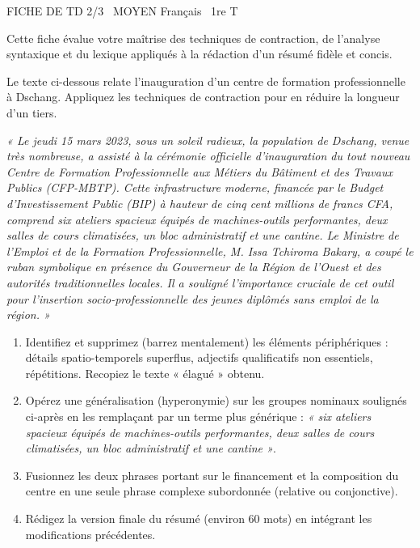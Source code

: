 \documentclass[11pt]{article}
\begin{document}
\begin{tcolorbox}[enhanced,colback=popink,colframe=popink,arc=10pt,boxrule=0pt,left=12pt,right=12pt,top=9pt,bottom=9pt]
{\color{white}\popxbold\small FICHE DE TD 2/3 \textbullet\ MOYEN \hfill Français \textbullet\ 1re T\par}
\end{tcolorbox}
\vspace{4pt}
Cette fiche évalue votre maîtrise des techniques de contraction, de l'analyse syntaxique et du lexique appliqués à la rédaction d'un résumé fidèle et concis.

\begin{exercice}
Le texte ci-dessous relate l'inauguration d'un centre de formation professionnelle à Dschang. Appliquez les techniques de contraction pour en réduire la longueur d'un tiers.

\textit{« Le jeudi 15 mars 2023, sous un soleil radieux, la population de Dschang, venue très nombreuse, a assisté à la cérémonie officielle d'inauguration du tout nouveau Centre de Formation Professionnelle aux Métiers du Bâtiment et des Travaux Publics (CFP-MBTP). Cette infrastructure moderne, financée par le Budget d'Investissement Public (BIP) à hauteur de cinq cent millions de francs CFA, comprend six ateliers spacieux équipés de machines-outils performantes, deux salles de cours climatisées, un bloc administratif et une cantine. Le Ministre de l'Emploi et de la Formation Professionnelle, M. Issa Tchiroma Bakary, a coupé le ruban symbolique en présence du Gouverneur de la Région de l'Ouest et des autorités traditionnelles locales. Il a souligné l'importance cruciale de cet outil pour l'insertion socio-professionnelle des jeunes diplômés sans emploi de la région. »}

\begin{enumerate}
    \item Identifiez et supprimez (barrez mentalement) les éléments périphériques : détails spatio-temporels superflus, adjectifs qualificatifs non essentiels, répétitions. Recopiez le texte « élagué » obtenu.
    \item Opérez une généralisation (hyperonymie) sur les groupes nominaux soulignés ci-après en les remplaçant par un terme plus générique : \textit{« six ateliers spacieux équipés de machines-outils performantes, deux salles de cours climatisées, un bloc administratif et une cantine »}.
    \item Fusionnez les deux phrases portant sur le financement et la composition du centre en une seule phrase complexe subordonnée (relative ou conjonctive).
    \item Rédigez la version finale du résumé (environ 60 mots) en intégrant les modifications précédentes.
\end{enumerate}
\end{exercice}
\end{document}
